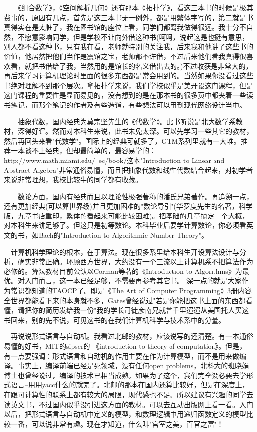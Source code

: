 　　《组合数学》，《空间解析几何》还有那本《拓扑学》，看这三本书的时候是极其费事的，原因有几点，首先是这三本书无一例外，都是用繁体字写的，第二就是书真得实在是太脏了，我在图书馆的座位上看，同学们都离我做得很远。我十分不自然，不愿意影响同学，但是学校不让向外借这种书(呵呵，说起这是也挺有意思，别人都不看这种书，只有我在看，老师就特别的关注我，后来我和他讲了这些书的价值，他居然把他们当作是震馆之宝，老师都不许借，不过后来他们看我真得很喜欢看，就把书借给了我，当然用的是馆长的名义借出去的。)不过收获是非常大的，再后来学习计算机理论时里面的很多东西都是常会用到的。当然如果你没看过这些书绝对理解不到那个层次。拿拓扑学来说，我们学校似乎是美开设这门课程，但是这门课程的重要性是显而易见的，没有想到的是在那本书的很多页中都夹着一些读书笔记，而那个笔记的作者及有些造诣，有些想法可以用到现代网络设计当中。 

　　抽象代数，国内经典为莫宗坚先生的《代数学》。此书听说是北大数学系教材，深得好评。然而对本科生来说，此书未免太深。可以先学习一些其它的教材，然后再回头来看"代数学"。国际上的经典可就多了，GTM系列里就有一大堆。推荐一本谈不上经典，但却最简单的，最容易学的：http://www.math.miami.edu/~ec/book/这本"Introduction to Linear and Abstract Algebra"非常通俗易懂，而且把抽象代数和线性代数结合起来，对初学者来说非常理想，我校比较牛的同学都有收藏。 

　　数论方面，国内有经典而且以理论性极强著称的潘氏兄弟著作。再追溯一点，还有更加经典(可以算世界级)并且更加困难的"数论导引"(华罗庚先生的名著，科学版，九章书店重印，繁体的看起来可能比较困难)。把基础的几章搞定一个大概，对本科生来讲足够了。但这只是初等数论。本科毕业后要学计算数论，你必须看英文的书，如Bach的"Introduction to Algorithmic Number Theory"。 

　计算机科学理论的根本，在于算法。现在很多系里给本科生开设算法设计与分析，确实非常正确。环顾西方世界，大约没有一个三流以上计算机系不把算法作为必修的。算法教材目前公认以Corman等著的《Introduction to Algorithms》为最优。对入门而言，这一本已经足够，不需要再参考其它书。 深一点的就是大家作为常识都知道的TAOCP了。即是《The Art of Computer Programming》3册内容全世界都能看下来的本身就不多，Gates曾经说过"若是你能把这书上面的东西都看懂，请把你的简历发给我一份"我的学长司徒彦南兄就曾千里迢迢从美国托人买这书回来，别的先不说，可见这书的在我们计算机科学与技术系中的分量。 

　再说说形式语言与自动机。我看过北邮的教材，应该说写的还清楚。有一本通俗易懂的好书，MIT的sipser的 《introduction to theory of computation》。但是，有一点要强调：形式语言和自动机的作用主要在作为计算模型，而不是用来做编译。事实上，编译前端已经是死领域，没有任何open problems，北科大的班晓娟博士也曾经说过，编译的技术已相当成熟。如果为了这个，我们完全没必要去学形式语言--用用yacc什么的就完了。北邮的那本在国内还算比较好，但是在深度上，在跟可计算性的联系上都有较大的局限，现代感也不足。所以建议有兴趣的同学去读英文书，不过国内似乎没引进这方面的教材。可以去互动出版网上看一看。入门以后，把形式语言与自动机中定义的模型，和数理逻辑中用递归函数定义的模型比较一番，可以说非常有趣。现在才知道，什么叫"宫室之美，百官之富"！ 

